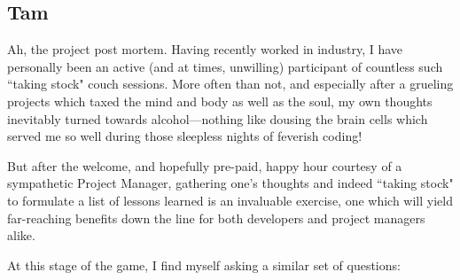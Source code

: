 \documentclass[12pt]{report}
\begin{document}
\subsection{Tam}

Ah, the project post mortem. Having recently worked in industry, I have personally been an active (and at times, unwilling) participant of countless such ``taking stock" couch sessions. More often than not, and especially after a grueling projects which taxed the mind and body as well as the soul, my own thoughts inevitably turned towards alcohol---nothing like dousing the brain cells which served me so well during those sleepless nights of feverish coding!

But after the welcome, and hopefully pre-paid, happy hour courtesy of a sympathetic Project Manager, gathering one's thoughts and indeed ``taking stock" to formulate a list of lessons learned is an invaluable exercise, one which will yield far-reaching benefits down the line for both developers and project managers alike.

At this stage of the game, I find myself asking a similar set of questions:
\end{document}
